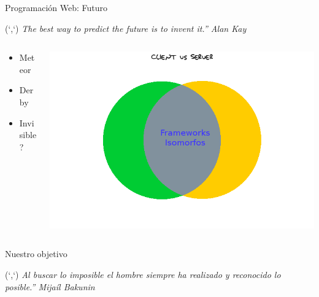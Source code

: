 \documentclass[xcolor=dvipsnames, 14pt]{beamer}
\newenvironment{reference}[2]{%
  \begin{textblock*}{\textwidth}(#1,#2)
      \footnotesize\it\bgroup\color{gray!50!black}}{\egroup\end{textblock*}}
\begin{document}
\begin{frame}{Programación Web: Futuro}
\begin{reference}{4mm}{13mm}
``The best way to predict the future is to invent it.'' Alan Kay
\end{reference}

\begin{columns}
    \begin{column}{0.3\textwidth}
        \begin{itemize}
            \item Meteor
            \item Derby
            \item Invisible?
        \end{itemize}
    \end{column}
    \begin{column}{0.7\textwidth}
        \begin{center}
            \includegraphics[width=\textwidth]{img/futuro.png}
        \end{center}
    \end{column}
\end{columns}

\end{frame}

\begin{frame}{Nuestro objetivo}
\begin{reference}{4mm}{13mm}
``Al buscar lo imposible el hombre siempre ha realizado y reconocido lo posible.'' Mijaíl Bakunin
\end{reference}

\end{frame}
\end{document}
